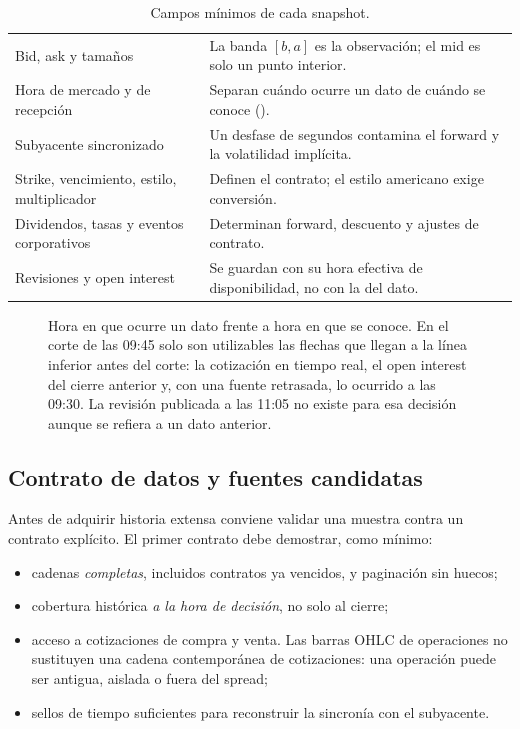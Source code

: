 \begin{table}[H]
\centering\small
\caption{Campos mínimos de cada snapshot.}
\label{tab:campos}
\begin{tabularx}{\linewidth}{@{}l Y@{}}
\toprule
{} & \\
\midrule
Bid, ask y tamaños & La banda $[b,a]$ es la observación; el mid es solo un punto interior.\\
Hora de mercado y de recepción & Separan cuándo ocurre un dato de cuándo se conoce ().\\
Subyacente sincronizado & Un desfase de segundos contamina el forward y la volatilidad implícita.\\
Strike, vencimiento, estilo, multiplicador & Definen el contrato; el estilo americano exige conversión.\\
Dividendos, tasas y eventos corporativos & Determinan forward, descuento y ajustes de contrato.\\
Revisiones y open interest & Se guardan con su hora efectiva de disponibilidad, no con la del dato.\\
\bottomrule
\end{tabularx}
\end{table}

\begin{figure}[H]
\centering
\resizebox{0.96\linewidth}{!}{}
\caption{Hora en que ocurre un dato frente a hora en que se conoce. En el corte de las 09:45 solo son
utilizables las flechas que llegan a la línea inferior antes del corte: la cotización en tiempo real,
el open interest del cierre anterior y, con una fuente retrasada, lo ocurrido a las 09:30. La revisión
publicada a las 11:05 no existe para esa decisión aunque se refiera a un dato anterior.}
\label{fig:puntual}
\end{figure}

\subsection{Contrato de datos y fuentes candidatas}\label{sec:contrato}

Antes de adquirir historia extensa conviene validar una muestra contra un contrato explícito. El
primer contrato debe demostrar, como mínimo:

\begin{itemize}
\item cadenas \emph{completas}, incluidos contratos ya vencidos, y paginación sin huecos;
\item cobertura histórica \emph{a la hora de decisión}, no solo al cierre;
\item acceso a cotizaciones de compra y venta. Las barras OHLC de operaciones no sustituyen una cadena
contemporánea de cotizaciones: una operación puede ser antigua, aislada o fuera del spread;
\item sellos de tiempo suficientes para reconstruir la sincronía con el subyacente.
\end{itemize}

